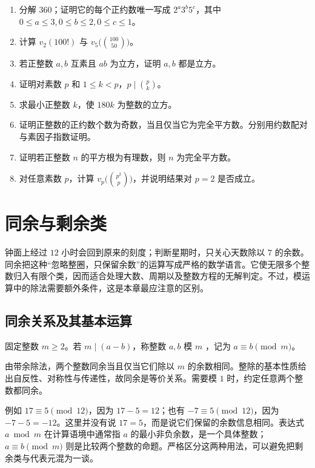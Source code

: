 \documentclass[UTF8,12pt,a4paper,fontset=fandol]{ctexbook}
\begin{document}
\begin{enumerate}
 \item 分解 $360$；证明它的每个正约数唯一写成 $2^a3^b5^c$，其中 $0\le a\le3,0\le b\le2,0\le c\le1$。
 \item 计算 $v_2(100!)$ 与 $v_5\bigl(\binom{100}{50}\bigr)$。
 \item 若正整数 $a,b$ 互素且 $ab$ 为立方，证明 $a,b$ 都是立方。
 \item 证明对素数 $p$ 和 $1\le k<p$，$p\mid\binom pk$。
 \item\label{ex:prime-cube} 求最小正整数 $k$，使 $180k$ 为整数的立方。
 \item\label{ex:prime-odd-divisors} 证明正整数的正约数个数为奇数，当且仅当它为完全平方数。分别用约数配对与素因子指数证明。
 \item\label{ex:prime-rational-root} 证明若正整数 $n$ 的平方根为有理数，则 $n$ 为完全平方数。
 \item\label{ex:prime-binomial} 对任意素数 $p$，计算 $v_p\bigl(\binom{p^2}{p}\bigr)$，并说明结果对 $p=2$ 是否成立。
\end{enumerate}

\chapter{同余与剩余类}
\label{ch:congruences}

钟面上经过 $12$ 小时会回到原来的刻度；判断星期时，只关心天数除以 $7$ 的余数。同余把这种“忽略整圈，只保留余数”的运算写成严格的数学语言。它使无限多个整数归入有限个类，因而适合处理大数、周期以及整数方程的无解判定。不过，模运算中的除法需要额外条件，这是本章最应注意的区别。

\section{同余关系及其基本运算}

\begin{definition}
固定整数 $m\ge2$。若 $m\mid(a-b)$，称整数 $a,b$ 模 $m$ ，记为 $a\equiv b\pmod m$。
\end{definition}

由带余除法，两个整数同余当且仅当它们除以 $m$ 的余数相同。整除的基本性质给出自反性、对称性与传递性，故同余是等价关系。需要模 $1$ 时，约定任意两个整数都同余。

例如 $17\equiv5\pmod{12}$，因为 $17-5=12$；也有 $-7\equiv5\pmod{12}$，因为 $-7-5=-12$。这里并没有说 $17=5$，而是说它们保留的余数信息相同。表达式 $a\bmod m$ 在计算语境中通常指 $a$ 的最小非负余数，是一个具体整数；$a\equiv b\pmod m$ 则是比较两个整数的命题。严格区分这两种用法，可以避免把剩余类与代表元混为一谈。
\end{document}
